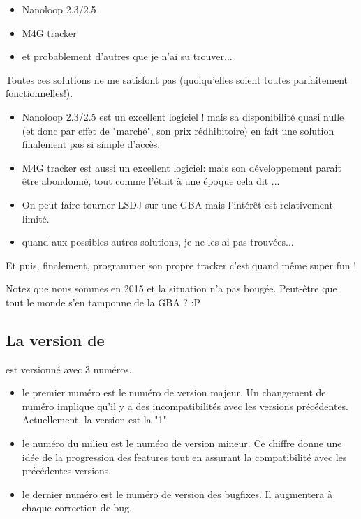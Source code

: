 \documentclass[12pt,a4paper]{article}
\begin{document}
    \begin{itemize}
        \item{Nanoloop 2.3/2.5}
        \item{M4G tracker}
        \item{et probablement d'autres que je n'ai su trouver...}
    \end{itemize}\medskip
    
    Toutes ces solutions ne me satisfont pas (quoiqu'elles soient toutes parfaitement fonctionnelles!).
    \medskip
    
    \begin{itemize}
        \item{Nanoloop 2.3/2.5 est un excellent logiciel ! mais sa disponibilité quasi nulle (et donc par effet de "marché", son prix rédhibitoire) en fait une solution finalement pas si simple d'accès.}
        \item{M4G tracker est aussi un excellent logiciel: mais son développement parait être abondonné, tout comme l'était \FAT à une époque cela dit ...}
        \item{On peut faire tourner LSDJ sur une GBA mais l'intérêt est relativement limité.}
        \item{quand aux possibles autres solutions, je ne les ai pas trouvées...}
    \end{itemize}\medskip
    
    Et puis, finalement, programmer son propre tracker c'est quand même super fun !
    \medskip

    Notez que nous sommes en 2015 et la situation n'a pas bougée. Peut-être que tout le monde s'en tamponne de la GBA ? :P \medskip

    \subsection{La version de \FAT}

    \FAT est versionné avec 3 numéros.
    \begin{itemize}
        \item{le premier numéro est le numéro de version majeur. Un changement de numéro implique qu'il y a des incompatibilités avec les versions précédentes.
                    Actuellement, la version est la "1"}
        \item{le numéro du milieu est le numéro de version mineur.
                    Ce chiffre donne une idée de la progression des features tout en assurant la compatibilité avec les précédentes versions.}
        \item{le dernier numéro est le numéro de version des bugfixes. Il augmentera à chaque correction de bug.}
    \end{itemize}
    \medskip
\end{document}
